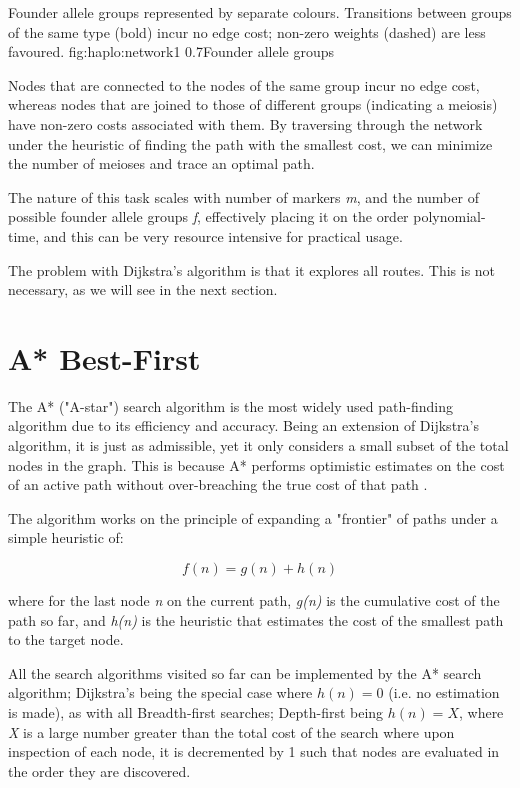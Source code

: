 	{Founder allele groups represented by separate colours. Transitions between groups of the same type (bold) incur no edge cost; non-zero weights (dashed) are less favoured.}
	{fig:haplo:network1}
	{0.7}{Founder allele groups}

Nodes that are connected to the nodes of the same group incur no edge cost, whereas nodes that are joined to those of different groups (indicating a meiosis) have non-zero costs associated with them. By traversing through the network under the heuristic of finding the path with the smallest cost, we can minimize the number of meioses and trace an optimal path.

The nature of this task scales with number of markers \textit{m}, and the number of possible founder allele groups \textit{f}, effectively placing it on the order polynomial-time, and this can be very resource intensive for practical usage.


The problem with Dijkstra's algorithm is that it explores all routes. This is not necessary, as we will see in the next section.

\section{A* Best-First}

The A* ("A-star")  search algorithm is the most widely used path-finding algorithm due to its efficiency and accuracy. Being an extension of Dijkstra's algorithm, it is just as admissible, yet it only considers a small subset of the total nodes in the graph. This is because A* performs optimistic estimates on the cost of an active path without over-breaching the true cost of that path \cite{astar}.

The algorithm works on the principle of expanding a "frontier" of paths under a simple heuristic of:

\begin{equation}
f(n) = g(n) + h(n)
\end{equation}


where for the last node \textit{n} on the current path, \textit{g(n)} is the cumulative cost of the path so far, and \textit{h(n)} is the heuristic that estimates the cost of the smallest path to the target node.

All the search algorithms visited so far can be implemented by the A* search algorithm; Dijkstra's being the special case where $h(n)= 0$ (i.e. no estimation is made), as with all Breadth-first searches; Depth-first being $h(n)=X$, where \textit{X} is a large number greater than the total cost of the search where upon inspection of each node, it is decremented by 1 such that nodes are evaluated in the order they are discovered.

